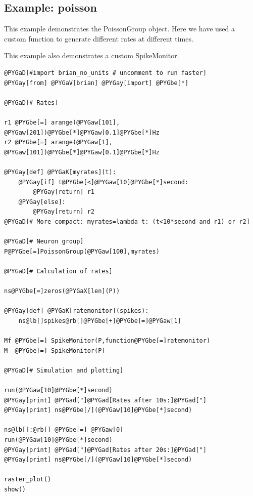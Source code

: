 \documentclass[letterpaper,10pt]{manual}
\begin{document}
\resetcurrentobjects
{}

\hypertarget{index-46}{}\subsection{Example: poisson}

This example demonstrates the PoissonGroup object. Here we have
used a custom function to generate different rates at different
times.

This example also demonstrates a custom SpikeMonitor.

\begin{Verbatim}[commandchars=@\[\]]
@PYGaD[#import brian_no_units # uncomment to run faster]
@PYGay[from] @PYGaV[brian] @PYGay[import] @PYGbe[*]

@PYGaD[# Rates]

r1 @PYGbe[=] arange(@PYGaw[101], @PYGaw[201])@PYGbe[*]@PYGaw[0.1]@PYGbe[*]Hz
r2 @PYGbe[=] arange(@PYGaw[1], @PYGaw[101])@PYGbe[*]@PYGaw[0.1]@PYGbe[*]Hz

@PYGay[def] @PYGaK[myrates](t):
    @PYGay[if] t@PYGbe[<]@PYGaw[10]@PYGbe[*]second:
        @PYGay[return] r1
    @PYGay[else]:
        @PYGay[return] r2
@PYGaD[# More compact: myrates=lambda t: (t<10*second and r1) or r2]

@PYGaD[# Neuron group]
P@PYGbe[=]PoissonGroup(@PYGaw[100],myrates)

@PYGaD[# Calculation of rates]

ns@PYGbe[=]zeros(@PYGaX[len](P))

@PYGay[def] @PYGaK[ratemonitor](spikes):
    ns@lb[]spikes@rb[]@PYGbe[+]@PYGbe[=]@PYGaw[1]

Mf @PYGbe[=] SpikeMonitor(P,function@PYGbe[=]ratemonitor)
M  @PYGbe[=] SpikeMonitor(P)

@PYGaD[# Simulation and plotting]

run(@PYGaw[10]@PYGbe[*]second)
@PYGay[print] @PYGad["]@PYGad[Rates after 10s:]@PYGad["]
@PYGay[print] ns@PYGbe[/](@PYGaw[10]@PYGbe[*]second)

ns@lb[]:@rb[] @PYGbe[=] @PYGaw[0]
run(@PYGaw[10]@PYGbe[*]second)
@PYGay[print] @PYGad["]@PYGad[Rates after 20s:]@PYGad["]
@PYGay[print] ns@PYGbe[/](@PYGaw[10]@PYGbe[*]second)

raster_plot()
show()
\end{Verbatim}

\resetcurrentobjects
{}
\end{document}

